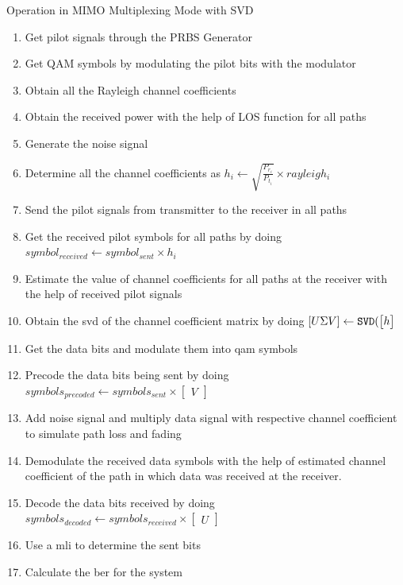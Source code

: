 \begin{algorithm}[!htbp]
\caption{Operation in MIMO Multiplexing Mode with SVD}
\label{alg:Operation in MIMO SVD Mode}
\begin{enumerate}
\item Get pilot signals through the PRBS Generator
\item Get QAM symbols by modulating the pilot bits with the modulator
\item Obtain all the Rayleigh channel coefficients
\item Obtain the received power with the help of LOS function for all  paths
\item Generate the noise signal
\item Determine all the channel coefficients as $h_i \gets \sqrt{\frac{P_{r_i}}{P_{t_i}}} \times rayleigh_i$
\item Send the pilot signals from transmitter to the receiver in all paths
\item Get the received pilot symbols for all paths by doing $symbol_{received} \gets symbol_{sent} \times h_i$
\item Estimate the value of channel coefficients for all paths at the receiver with the help of received pilot signals
\item Obtain the \acrlong{svd} of the channel coefficient matrix by doing $[U \Sigma V] \gets \verb|SVD|(\begin{bmatrix} h \end{bmatrix}$
\item Get the data bits and modulate them into \acrshort{qam} symbols
\item Precode the data bits being sent by doing $symbols_{precoded} \gets symbols_{sent} \times \begin{bmatrix} V \end{bmatrix}$
\item Add noise signal and multiply data signal with respective channel coefficient to simulate path loss and fading
\item Demodulate the received data symbols with the help of estimated channel coefficient of the path in which data was received at the receiver.
\item Decode the data bits received by doing $symbols_{decoded} \gets symbols_{received} \times \begin{bmatrix} U \end{bmatrix}$
\item Use a \acrlong{mli} to determine the sent bits
\item Calculate the \acrshort{ber} for the system
\end{enumerate}
\end{algorithm}

